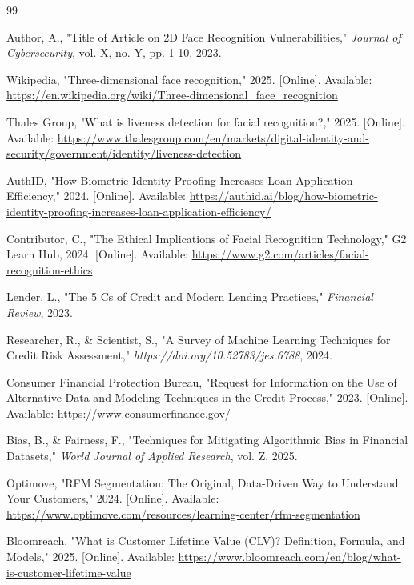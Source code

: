 \documentclass[lettersize,journal]{IEEEtran}
\begin{document}
\begin{thebibliography}{99}

Author, A., "Title of Article on 2D Face Recognition Vulnerabilities," \textit{Journal of Cybersecurity}, vol. X, no. Y, pp. 1-10, 2023.

Wikipedia, "Three-dimensional face recognition," 2025. [Online]. Available: \url{https://en.wikipedia.org/wiki/Three-dimensional_face_recognition}

Thales Group, "What is liveness detection for facial recognition?," 2025. [Online]. Available: \url{https://www.thalesgroup.com/en/markets/digital-identity-and-security/government/identity/liveness-detection}

AuthID, "How Biometric Identity Proofing Increases Loan Application Efficiency," 2024. [Online]. Available: \url{https://authid.ai/blog/how-biometric-identity-proofing-increases-loan-application-efficiency/}

Contributor, C., "The Ethical Implications of Facial Recognition Technology," G2 Learn Hub, 2024. [Online]. Available: \url{https://www.g2.com/articles/facial-recognition-ethics}

Lender, L., "The 5 Cs of Credit and Modern Lending Practices," \textit{Financial Review}, 2023.

Researcher, R., \& Scientist, S., "A Survey of Machine Learning Techniques for Credit Risk Assessment," \textit{https://doi.org/10.52783/jes.6788}, 2024.

Consumer Financial Protection Bureau, "Request for Information on the Use of Alternative Data and Modeling Techniques in the Credit Process," 2023. [Online]. Available: \url{https://www.consumerfinance.gov/}


Bias, B., \& Fairness, F., "Techniques for Mitigating Algorithmic Bias in Financial Datasets," \textit{World Journal of Applied Research}, vol. Z, 2025.

Optimove, "RFM Segmentation: The Original, Data-Driven Way to Understand Your Customers," 2024. [Online]. Available: \url{https://www.optimove.com/resources/learning-center/rfm-segmentation}

Bloomreach, "What is Customer Lifetime Value (CLV)? Definition, Formula, and Models," 2025. [Online]. Available: \url{https://www.bloomreach.com/en/blog/what-is-customer-lifetime-value}


\end{thebibliography}
\end{document}

